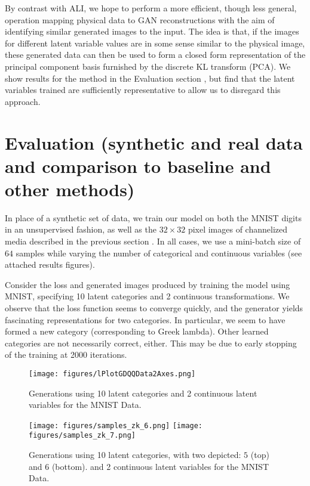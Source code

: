 \documentclass{article}
\begin{document}
By contrast with ALI, we hope to perform a more efficient, though less general, operation mapping physical data to GAN reconstructions with the aim of identifying similar generated images to the input.  The idea is that, if the images for different latent variable values are in some sense similar to the physical image, these generated data can then be used to form a closed form representation of the principal component basis furnished by the discrete KL transform (PCA).  We show results for the method in the Evaluation section \label{evaluation}, but find that the latent variables trained are sufficiently representative to allow us to disregard this approach. 


\section{Evaluation (synthetic and real data and comparison to baseline and other methods)}\label{evaluation}

In place of a synthetic set of data, we train our model on both the MNIST digits in an unsupervised fashion, as well as the $32\times 32$ pixel images of channelized media described in the previous section \label{related}.  In all cases, we use a mini-batch size of $64$ samples while varying the number of categorical and continuous variables (see attached results figures).

Consider the loss \label{MNISTt} and generated images \label{MNISTg} produced by training the model using MNIST, specifying 10 latent categories and 2 continuous transformations.  We observe that the loss function seems to converge quickly, and the generator yields fascinating representations for two categories.  In particular, we seem to have formed a new category (corresponding to Greek lambda).  Other learned categories are not necessarily correct, either.  This may be due to early stopping of the training at 2000 iterations.

\begin{figure}[h]
  \texttt{[image: figures/lPlotGDQQData2Axes.png]}
  \caption{Generations using 10 latent categories and 2 continuous latent variables for the MNIST Data. }
\end{figure}\label{MNISTt}

\begin{figure}[h]
  \texttt{[image: figures/samples\_zk\_6.png]}
  \texttt{[image: figures/samples\_zk\_7.png]}
  \caption{Generations using 10 latent categories, with two depicted: $5$ (top) and $6$ (bottom). and 2 continuous latent variables for the MNIST Data.}
\end{figure}\label{MNISTg}
\end{document}
